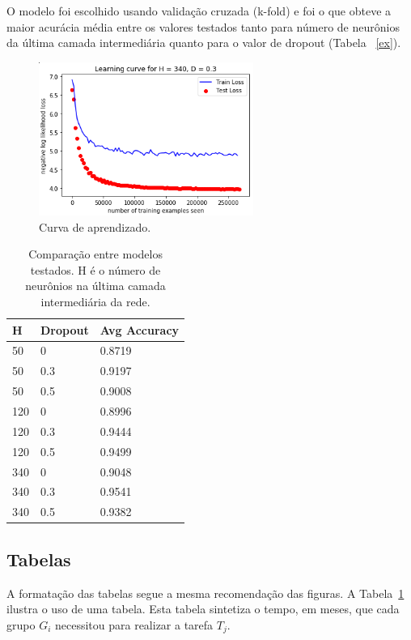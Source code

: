 \documentclass[11pt]{article}
\begin{document}
O modelo foi escolhido usando validação cruzada (k-fold) e foi o que obteve a maior acurácia média entre os valores testados tanto para número de neurônios da última camada intermediária quanto para o valor de dropout (Tabela ~\ref{ex}).

  \begin{figure}[H]
        {\centering
        \includegraphics[width=70mm]{images/learning.png}
        \caption{Curva de aprendizado.}
        \label{fig:learning}\par}
  \end{figure}

\begin{table}[]
    {\centering
\begin{tabular}{@{}lll@{}}
\toprule
H   & Dropout & Avg Accuracy \\ \midrule
50  & 0       & 0.8719       \\
50  & 0.3     & 0.9197       \\
50  & 0.5     & 0.9008       \\
120 & 0       & 0.8996       \\
120 & 0.3     & 0.9444       \\
120 & 0.5     & 0.9499       \\
340 & 0       & 0.9048       \\
340 & 0.3     & 0.9541       \\
340 & 0.5     & 0.9382       \\ \bottomrule
\end{tabular}
\caption{Comparação entre modelos testados. H é o número de neurônios na última camada intermediária da rede.}
\label{tab:ex}
    \par}
\end{table}

\subsection{Tabelas}
\label{ssec:tabelas}

A formata\c{c}\~{a}o das tabelas segue a mesma recomenda\c{c}\~{a}o das figuras.
A Tabela~\ref{tab:ex} ilustra o uso de uma tabela. Esta tabela sintetiza
o tempo, em meses, que cada grupo $G_i$ necessitou para realizar a
tarefa $T_j$.
\end{document}

